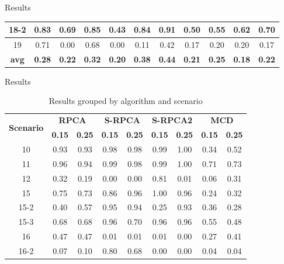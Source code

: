 \documentclass[newPxFont, numfooter, sectionpages]{beamer}
\begin{document}
\begin{frame}[c]{Results}
\begin{table}[h!]
\begin{tabular}{ c|c c|c c|c c|c c|c c }
			18-2 & 0.83 & 0.69 & 0.85 & 0.43 & 0.84 &\color{red} 0.91 & 0.50 & 0.55 & 0.62 & 0.70 \\ \hline
			19 &\color{red} 0.71 & 0.00 & 0.68 & 0.00 & 0.11 & 0.42 & 0.17 & 0.20 & 0.20 & 0.17 \\ \hline
			\rowcolor{Gray} \textbf{avg} & \textbf{0.28} & \textbf{0.22} & \textbf{0.32} & \textbf{0.20} & \textbf{0.38} &\color{red} \textbf{0.44} & \textbf{0.21} & \textbf{0.25} & \textbf{0.18} & \textbf{0.22} \\ 
	    \bottomrule
	  \end{tabular}
	\end{table}
\end{frame}

\begin{frame}[c]{Results}
	\begin{table}[h!]
	  \centering
	  \scriptsize
	  \caption{Results grouped by algorithm and scenario}
	  \label{tab:tab03}
	  \begin{tabular}{ c|c c|c c|c c|c c }
		\toprule
		\multirow{2}{*}{\textbf{Scenario}}   &\multicolumn{2}{c}{\textbf{RPCA}} &\multicolumn{2}{c}{\textbf{S-RPCA}} &\multicolumn{2}{c}{\textbf{S-RPCA2}} &\multicolumn{2}{c}{\textbf{MCD}}\\ 
				\hhline{~--------}
				&\textbf{0.15} &\textbf{0.25} &\textbf{0.15} &\textbf{0.25} &\textbf{0.15} &\textbf{0.25} &\textbf{0.15} &\textbf{0.25}\\
		\midrule
			10 & 0.93 & 0.93 &\color{red} 0.98 &\color{red} 0.98 &\color{red} 0.99 &\color{red} 1.00 & 0.34 & 0.52 \\ \hline
			11 & 0.96 & 0.94 &\color{red} 0.99 &\color{red} 0.98 &\color{red} 0.99 &\color{red} 1.00 & 0.71 & 0.73 \\ \hline
			12 & 0.32 & 0.19 & 0.00 & 0.00 &\color{red} 0.81 & 0.01 & 0.06 & 0.31 \\ \hline
			15 & 0.75 & 0.73 & 0.86 &\color{red} 0.96 &\color{red} 1.00 &\color{red} 0.96 & 0.24 & 0.32 \\ \hline
			15-2 & 0.40 & 0.57 &\color{red} 0.95 &\color{red} 0.94 & 0.25 & 0.93 & 0.36 & 0.28 \\ \hline
			15-3 & 0.68 & 0.68 &\color{red} 0.96 & 0.70 &\color{red} 0.96 &\color{red} 0.96 & 0.55 & 0.48 \\ \hline
			16 &\color{red} 0.47 &\color{red} 0.47 & 0.01 & 0.01 & 0.01 & 0.00 & 0.27 & 0.41 \\ \hline
			16-2 & 0.07 & 0.10 &\color{red} 0.80 & 0.68 & 0.00 & 0.00 & 0.04 & 0.04 \\ \hline

\end{tabular}
\end{table}
\end{frame}
\end{document}
